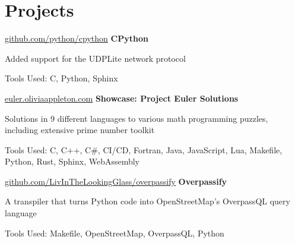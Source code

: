 	\vspace{-0.1 cm}

	\section{Projects}

	\begin{twocolentry}
		{ \href{https://github.com/python/cpython}{github.com/python/cpython} } \textbf{CPython}
	\end{twocolentry}

	\begin{onecolentry}
		\begin{highlights}
			\item Added support for the UDPLite network protocol \item Tools Used: C, Python,
			Sphinx
		\end{highlights}
	\end{onecolentry}

	\vspace{0.2 cm}

	\begin{twocolentry}
		{ \href{https://euler.oliviaappleton.com}{euler.oliviaappleton.com} } \textbf{Showcase:
		Project Euler Solutions}
	\end{twocolentry}

	\begin{onecolentry}
		\begin{highlights}
			\item Solutions in 9 different languages to various math programming puzzles, including extensive prime number toolkit
			\item Tools Used: C, C+\!+, C\#, CI/CD, Fortran, Java, JavaScript, Lua,
			Makefile, Python, Rust, Sphinx, WebAssembly
		\end{highlights}
	\end{onecolentry}

	\vspace{0.2 cm}

	\begin{twocolentry}
		{ \hspace{-3 cm} \href{https://github.com/LivInTheLookingGlass/overpassify}{ \mbox{github.com/LivInTheLookingGlass/overpassify}} } \textbf{Overpassify}
	\end{twocolentry}

	\begin{onecolentry}
		\begin{highlights}
			\item A transpiler that turns Python code into OpenStreetMap's OverpassQL query language
			\item Tools Used: Makefile, OpenStreetMap, OverpassQL, Python
		\end{highlights}
	\end{onecolentry}

